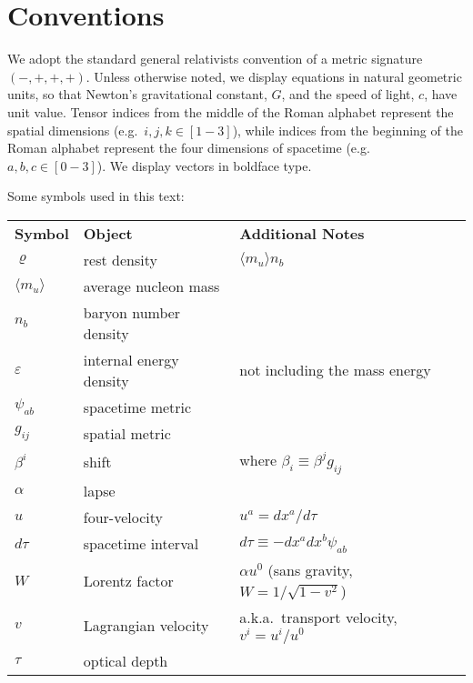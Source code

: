 
\section{Conventions}
\label{sec:conventions}

We adopt the standard general relativists convention of a metric signature
$(-,+,+,+)$.
Unless otherwise noted, we display equations in natural geometric units, so that
Newton's gravitational constant, $G$, and the speed of light, $c$, have unit
value.
Tensor indices from the middle of the Roman alphabet represent the spatial
dimensions (e.g.\ $i,j,k\in[1-3]$), while indices from the beginning of the Roman
alphabet represent the four dimensions of spacetime (e.g.\ $a,b,c\in[0-3]$).
We display vectors in boldface type.

Some symbols used in this text:

\begin{tabular}{lll}
  \textbf{Symbol}       & \textbf{Object}           & \textbf{Additional Notes} \\
  $\varrho$             & rest density              & $\langle m_u \rangle n_b $ \\
  $\langle m_u \rangle$ & average nucleon mass      & \\
  $n_b$                 & baryon number density     & \\
  $\varepsilon$         & internal energy density   & not including the mass energy \\
  $\psi_{ab}$           & spacetime metric          & \\
  $g_{ij}$              & spatial metric            & \\
  $\beta^i$             & shift                     & where $\beta_i \equiv \beta^j g_{ij}$ \\
  $\alpha$              & lapse                     & \\
  $u$                   & four-velocity             & $u^a=dx^a/d\tau$ \\
  $d\tau$               & spacetime interval        & $d\tau\equiv-dx^a dx^b \psi_{ab}$ \\
  $W$                   & Lorentz factor            & $\alpha u^0$ (sans gravity, $W=1/\sqrt{1-v^2}$) \\
  $v$                   & Lagrangian velocity       & a.k.a.\ transport velocity, $v^i=u^i/u^0$ \\
  $\tau$                & optical depth             & \\
\end{tabular}
